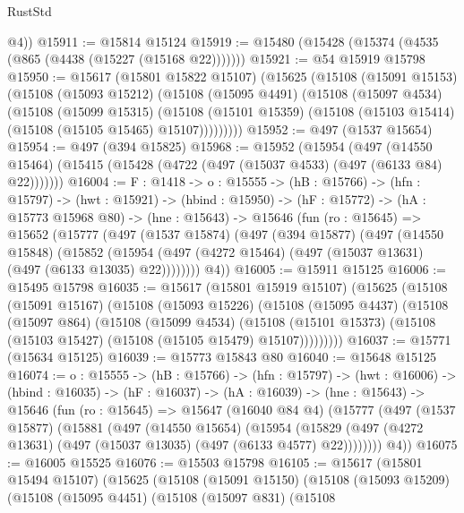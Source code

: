 \begin{lexlean}{RustStd}
\begin{coremodule}
        @4))
@15911 := @15814 @15124
@15919 := @15480 (@15428 (@15374 (@4535 (@865 (@4438 (@15227 (@15168 @22)))))))
@15921 := @54 @15919 @15798
@15950 := @15617
    (@15801 @15822 @15107)
    (@15625
      (@15108
        (@15091 @15153)
        (@15108
          (@15093 @15212)
          (@15108
            (@15095 @4491)
            (@15108
              (@15097 @4534)
              (@15108
                (@15099 @15315)
                (@15108
                  (@15101 @15359)
                  (@15108 (@15103 @15414) (@15108 (@15105 @15465) @15107)))))))))
@15952 := @497 (@1537 @15654)
@15954 := @497 (@394 @15825)
@15968 := @15952
    (@15954
      (@497 (@14550 @15464) (@15415 (@15428 (@4722 (@497 (@15037 @4533) (@497 (@6133 @84) @22)))))))
@16004 := {F : @1418} ->
  {o : @15555} ->
  (hB : @15766) ->
  (hfn : @15797) ->
  (hwt : @15921) ->
  (hbind : @15950) ->
  (hF : @15772) ->
  (hA : @15773 @15968 @80) ->
  (hne : @15643) ->
  @15646
    (fun (ro : @15645) =>
    @15652
      (@15777
        (@497
          (@1537 @15874)
          (@497
            (@394 @15877)
            (@497
              (@14550 @15848)
              (@15852
                (@15954 (@497 (@4272 @15464) (@497 (@15037 @13631) (@497 (@6133 @13035) @22))))))))
        @4))
@16005 := @15911 @15125
@16006 := @15495 @15798
@16035 := @15617
    (@15801 @15919 @15107)
    (@15625
      (@15108
        (@15091 @15167)
        (@15108
          (@15093 @15226)
          (@15108
            (@15095 @4437)
            (@15108
              (@15097 @864)
              (@15108
                (@15099 @4534)
                (@15108
                  (@15101 @15373)
                  (@15108 (@15103 @15427) (@15108 (@15105 @15479) @15107)))))))))
@16037 := @15771 (@15634 @15125)
@16039 := @15773 @15843 @80
@16040 := @15648 @15125
@16074 := {o : @15555} ->
  (hB : @15766) ->
  (hfn : @15797) ->
  (hwt : @16006) ->
  (hbind : @16035) ->
  (hF : @16037) ->
  (hA : @16039) ->
  (hne : @15643) ->
  @15646
    (fun (ro : @15645) =>
    @15647
      (@16040 @84 @4)
      (@15777
        (@497
          (@1537 @15877)
          (@15881
            (@497
              (@14550 @15654)
              (@15954
                (@15829 (@497 (@4272 @13631) (@497 (@15037 @13035) (@497 (@6133 @4577) @22))))))))
        @4))
@16075 := @16005 @15525
@16076 := @15503 @15798
@16105 := @15617
    (@15801 @15494 @15107)
    (@15625
      (@15108
        (@15091 @15150)
        (@15108
          (@15093 @15209)
          (@15108
            (@15095 @4451)
            (@15108
              (@15097 @831)
              (@15108

\end{coremodule}
\end{lexlean}
